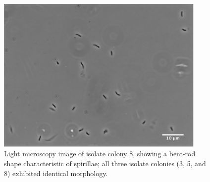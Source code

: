 \documentclass{article}
\begin{document}
\begin{figure}[!ht]
  \centerline{\includegraphics[width=4in]{spirilla.png}}
  \caption{Light microscopy image of isolate colony 8, showing a
    bent-rod shape characteristic of spirillae; all three isolate
    colonies (3, 5, and 8) exhibited identical morphology.}
  \label{fig:spirilla}
\end{figure}
\end{document}
